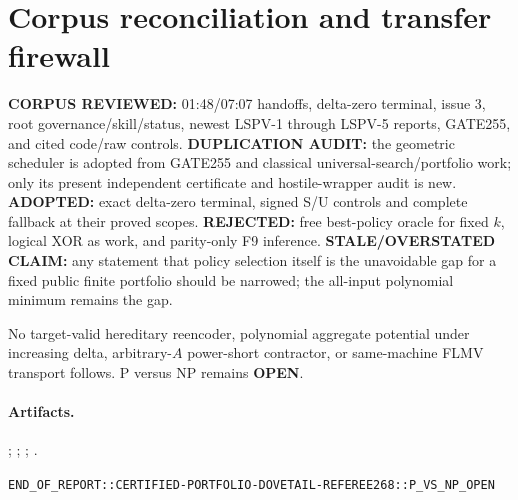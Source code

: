 \documentclass[11pt]{article}
\newcommand{\OPEN}{\textbf{OPEN}}
\begin{document}
\section{Corpus reconciliation and transfer firewall}
\textbf{CORPUS REVIEWED:} 01:48/07:07 handoffs, delta-zero terminal, issue 3,
root governance/skill/status, newest LSPV-1 through LSPV-5 reports, GATE255,
and cited code/raw controls.  \textbf{DUPLICATION AUDIT:} the geometric
scheduler is adopted from GATE255 and classical universal-search/portfolio
work; only its present independent certificate and hostile-wrapper audit is
new.  \textbf{ADOPTED:} exact delta-zero terminal, signed S/U controls and
complete fallback at their proved scopes.  \textbf{REJECTED:} free best-policy
oracle for fixed $k$, logical XOR as work, and parity-only F9 inference.
\textbf{STALE/OVERSTATED CLAIM:} any statement that policy selection itself is
the unavoidable gap for a fixed public finite portfolio should be narrowed;
the all-input polynomial minimum remains the gap.

No target-valid hereditary reencoder, polynomial aggregate potential under
increasing delta, arbitrary-$A$ power-short contractor, or same-machine FLMV
transport follows.  P versus NP remains \OPEN.

\paragraph{Artifacts.}
;
;
;
.

\bigskip\noindent
\texttt{END\_OF\_REPORT::CERTIFIED-PORTFOLIO-DOVETAIL-REFEREE268::P\_VS\_NP\_OPEN}
\end{document}
